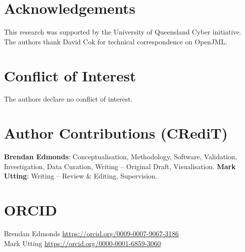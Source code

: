 \documentclass[11pt]{article}
\begin{document}
\section*{Acknowledgements}

This research was supported by the University of Queensland Cyber initiative. The authors thank David Cok for technical correspondence on OpenJML.

\section*{Conflict of Interest}

The authors declare no conflict of interest.

\section*{Author Contributions (CRediT)}

\textbf{Brendan Edmonds}: Conceptualisation, Methodology, Software, Validation, Investigation, Data Curation, Writing -- Original Draft, Visualisation. \textbf{Mark Utting}: Writing -- Review \& Editing, Supervision.

\section*{ORCID}

Brendan Edmonds \url{https://orcid.org/0009-0007-9067-3186}\\
Mark Utting \url{https://orcid.org/0000-0001-6859-3060}
\end{document}
